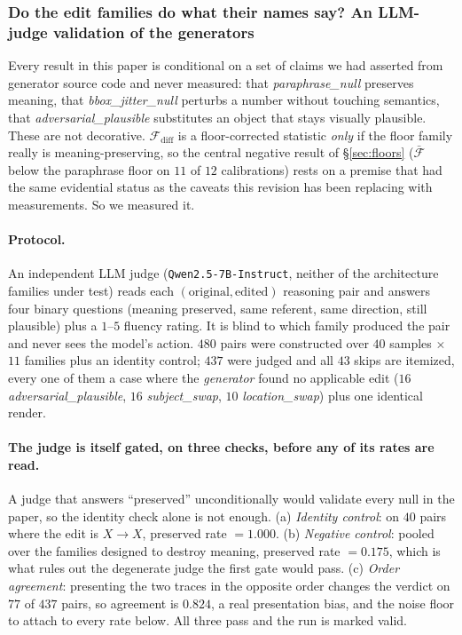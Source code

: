 \subsubsection{Do the edit families do what their names say? An LLM-judge validation of the generators}
\label{sec:judge_edits}

Every result in this paper is conditional on a set of claims we had asserted from generator source code and never measured: that \emph{paraphrase\_null} preserves meaning, that \emph{bbox\_jitter\_null} perturbs a number without touching semantics, that \emph{adversarial\_plausible} substitutes an object that stays visually plausible. These are not decorative. $\mathcal{F}_{\text{diff}}$ is a floor-corrected statistic \emph{only} if the floor family really is meaning-preserving, so the central negative result of \S\ref{sec:floors} ($\bar{\mathcal{F}}$ below the paraphrase floor on $11$ of $12$ calibrations) rests on a premise that had the same evidential status as the caveats this revision has been replacing with measurements. So we measured it.

\paragraph{Protocol.} An independent LLM judge (\texttt{Qwen2.5-7B-Instruct}, neither of the architecture families under test) reads each $(\text{original}, \text{edited})$ reasoning pair and answers four binary questions (meaning preserved, same referent, same direction, still plausible) plus a $1$--$5$ fluency rating. It is blind to which family produced the pair and never sees the model's action. $480$ pairs were constructed over $40$ samples $\times$ $11$ families plus an identity control; $437$ were judged and all $43$ skips are itemized, every one of them a case where the \emph{generator} found no applicable edit ($16$ \emph{adversarial\_plausible}, $16$ \emph{subject\_swap}, $10$ \emph{location\_swap}) plus one identical render.

\paragraph{The judge is itself gated, on three checks, before any of its rates are read.} A judge that answers ``preserved'' unconditionally would validate every null in the paper, so the identity check alone is not enough. (a) \emph{Identity control}: on $40$ pairs where the edit is $X \to X$, preserved rate $= \mathbf{1.000}$. (b) \emph{Negative control}: pooled over the families designed to destroy meaning, preserved rate $= \mathbf{0.175}$, which is what rules out the degenerate judge the first gate would pass. (c) \emph{Order agreement}: presenting the two traces in the opposite order changes the verdict on $77$ of $437$ pairs, so agreement is $\mathbf{0.824}$, a real presentation bias, and the noise floor to attach to every rate below. All three pass and the run is marked valid.

